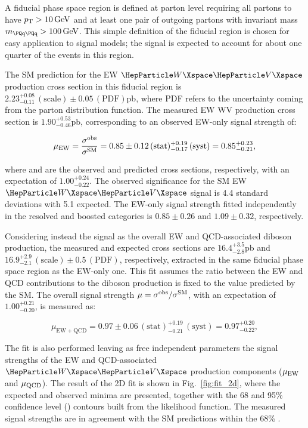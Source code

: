 A fiducial phase space region is defined at parton level requiring all partons to have $p_{\mathrm{T}} > 10\,\text{Ge\hspace{-.08em}V}$ and at least one
pair of outgoing partons with invariant mass $m_{\PQq\PQq}>100\GeV$.  This simple definition of the fiducial region is
chosen for easy application to signal models; the signal is expected to account for about one quarter of the events in
this region.

The SM prediction for the EW $\PW\PV$ production
cross section in this fiducial region is $2.23^{+0.08}_{-0.11}\,(\text{scale}) \pm0.05\,(\text{PDF})$\unit{pb}, where
PDF refers to the uncertainty coming from the parton distribution function.  The measured EW WV production cross section is
$1.90^{+0.53}_{-0.46}$\unit{pb}, corresponding to an observed EW-only signal strength of:
\begin{linenomath}
\begin{equation}
\mu_{\mathrm{EW}} = \frac{\sigma^{\text{obs}}}{\sigma^{\text{SM}}} =  0.85\pm0.12\,(\text{stat})^{+0.19}_{-0.17}\,(\text{syst}) =0.85 ^{+0.23}_{-0.21},
\end{equation}
\end{linenomath}
where \sobs and \ssm are the observed and predicted cross sections, respectively, with an expectation of
$1.00^{+0.24}_{-0.22}$.  The observed significance for the SM EW $\PW\PV$ signal is 4.4 standard deviations with 5.1
expected. The EW-only signal strength fitted independently in the resolved and boosted categories is $0.85\pm0.26$ and
$1.09\pm0.32$, respectively.

Considering instead the signal as the overall EW and QCD-associated diboson production, the measured and expected cross
sections are $16.4^{+3.5}_{-2.8}$\unit{pb} and $16.9^{+2.9}_{-2.1}\,(\text{scale}) \pm0.5\,(\text{PDF})$, respectively,
extracted in the same fiducial phase space region as the EW-only one. This fit assumes the ratio between the EW and
QCD contributions to the diboson production is fixed to the value predicted by the SM.  The overall signal strength
$\mu = \sigma^{\text{obs}} / \sigma^{\text{SM}}$, with an expectation of $1.00^{+0.21}_{-0.20}$, is measured as:
\begin{linenomath}
\begin{equation}
\mu_{\mathrm{EW}+\mathrm{QCD}} =  0.97\pm0.06\,(\text{stat})^{+0.19}_{-0.21}\,(\text{syst})= 0.97 ^{+0.20}_{-0.22} ,
\end{equation}
\end{linenomath}
The fit is also performed leaving as free independent parameters the signal strengths of the EW and QCD-associated
$\PW\PV$ production components ($\mu_{\mathrm{EW}}$ and $\mu_{\mathrm{QCD}}$).  The result of the 2D fit is shown in Fig.~\ref{fig:fit_2d}, where
the expected and observed minima are presented, together with the 68 and 95\% confidence level (\CL) contours built from
the likelihood function.  The measured signal strengths are in agreement with the SM predictions within the 68\% \CL.

